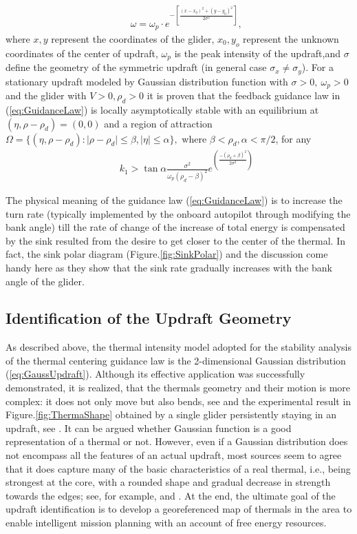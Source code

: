 \documentclass{ifacconf}
\begin{document}
\begin{eqnarray}
    && \omega=\omega_p \cdot e^{-[\frac{(x-x_0)^2+(y-y_0)^2}{2\sigma^2}]},
    \label{eq:GaussUpdraft}
\end{eqnarray}
where $x, y$ represent the coordinates of the glider, $x_0, y_o$ represent the unknown coordinates of the center of updraft, $\omega_p$ is the peak intensity of the updraft,and $\sigma$ define the geometry of the symmetric updraft (in general case $\sigma_x \neq \sigma_y$). For a stationary updraft modeled by Gaussian distribution function with $\sigma>0,~\omega_p>0$ and the glider with $V>0, \rho_d>0$ it is proven that the feedback guidance law in (\ref{eq:GuidanceLaw}) is locally asymptotically stable with an equilibrium at $(\eta, \rho-\rho_d)=(0,0)$ and a region of attraction $\Omega=\{(\eta, \rho-\rho_d): \vert \rho-\rho_d \vert \leq \beta,  \vert \eta \vert \leq \alpha \}, $ where $\beta < \rho_d, \alpha< \pi/2$, for any
\begin{eqnarray}
    && k_1 > \tan \alpha \frac{\sigma^2}{\omega_p(\rho_d-\beta)^2} e^(\frac{-(\rho_d+\beta)^2}{2\sigma^2} )\nonumber
    \label{eq:GuidanceGain}
\end{eqnarray}

The physical meaning of the guidance law (\ref{eq:GuidanceLaw}) is to increase the turn rate (typically implemented by the onboard autopilot through modifying the bank angle) till the rate of change of the increase of total energy is compensated by the sink resulted from the desire to get closer to the center of the thermal. In fact, the sink polar diagram (Figure.\ref{fig:SinkPolar}) and the discussion come handy here as they show that the sink rate gradually increases with the bank angle of the glider.

\subsection{Identification of the Updraft Geometry}
\label{subsec:UpdraftID}
As described above, the thermal intensity model adopted for the stability analysis of the thermal centering guidance law is the 2-dimensional Gaussian distribution (\ref{eq:GaussUpdraft}). Although its effective application was successfully demonstrated, it is realized, that the thermals geometry and their motion is more complex: it does not only move but also bends, see \cite{Reichmann:1978} and the experimental result in  Figure.\ref{fig:ThermaShape} obtained by a single glider persistently staying in an updraft, see \cite{AKlass_JGCD:2012}.  It can be argued whether Gaussian function is a good representation of a thermal or not. However, even if a Gaussian distribution does not encompass all the features of an actual updraft, most sources seem to agree that it does capture many of the basic characteristics of a real thermal, i.e., being strongest at the core, with a rounded shape and gradual decrease in strength towards the edges; see, for example, \cite{Wharington:1998} and \cite{Pagen:1992}. At the end, the ultimate goal of the updraft identification is to develop a georeferenced map of thermals in the area to enable intelligent mission planning with an account of free energy resources.
\end{document}
